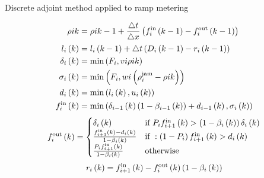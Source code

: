 \begin{frame}{Discrete adjoint method applied to ramp metering}
\begin{minipage}[t]{0.30\linewidth}
\end{minipage}\hfill
\begin{minipage}[t]{0.4\linewidth}
\begin{align}
&& \rho{i}{k} & =\rho{i}{k-1}+\frac{\triangle t}{\triangle x}\left(f_{i}^{\text{in}}\left(k-1\right)-f_{i}^{\text{out}}\left(k-1\right)\right) &  \nonumber \\
&& l_{i}\left(k\right) & =l_{i}\left(k-1\right)+\triangle t\left(D_{i}\left(k-1\right)-r_{i}\left(k-1\right)\right) &  \nonumber \\
&& \delta_{i}\left(k\right) & =\min\left(F_{i},v{i}\rho{i}{k}\right) &  \nonumber \\
&& \sigma_{i}\left(k\right) & =\min\left(F_{i},w{i}\left(\rho^{\text{jam}}_{i}-\rho{i}{k}\right)\right) & \nonumber \\
&& d_{i}\left(k\right) & =\min\left(l_{i}\left(k\right),u_{i}\left(k\right)\right) &  \nonumber \\
&& f_{i}^{\text{in}}\left(k\right) & =\min\left(\delta_{i-1}\left(k\right)\left(1-\beta_{i-1}\left(k\right)\right)+d_{i-1}\left(k\right),\sigma_{i}\left(k\right)\right) & \nonumber
\end{align}
\begin{multline}
f_{i}^{\text{out}}\left(k\right)
=\begin{cases}
\delta_{i}\left(k\right) 
& \text{if } P_{i}f_{i+1}^{\text{in}}\left(k\right) > \left(1-\beta_{i}\left(k\right)\right)\delta_{i}\left(k\right)
\\
\frac{f_{i+1}^{\text{in}}\left(k\right)-d_{i}\left(k\right)}{1-\beta_{i}\left(k\right)}
& \text{if } : \left(1-P_{i}\right)f_{i+1}^{\text{in}}\left(k\right) > d_{i}\left(k\right)
\\
\frac{P_{i}f_{i+1}^{\text{in}}\left(k\right)}{1-\beta_{i}\left(k\right)} & \text{otherwise } 
\end{cases} \nonumber
\end{multline}
\begin{align}
&& r_{i}\left(k\right) & = f_{i+1}^{\text{in}}\left(k\right) - f_{i}^{\text{out}}\left(k\right)\left(1-\beta_{i}\left(k\right)\right)& \nonumber
\end{align}

\end{minipage}

\end{frame}